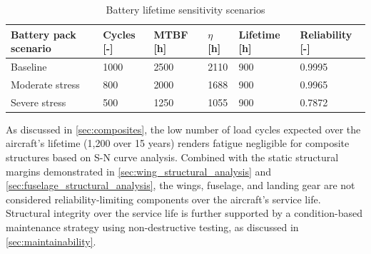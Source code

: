 \begin{table}[H]
    \centering
    \caption{Battery lifetime sensitivity scenarios}
    \label{tab:battery_lifetime_scenarios}
    \begin{tabular}{|p{2.6cm}|p{1.7cm}|p{1.7cm}|p{1.0cm}|p{2.0cm}|p{2.4cm}|}
        \hline
        \textbf{Battery pack scenario} &
        \textbf{Cycles [-]} &
        \textbf{MTBF [h]} &
        \textbf{$\eta$ [h]} &
        \textbf{Lifetime [h]} &
        \textbf{Reliability [-]} \\
        \hline\hline
        Baseline
        & 1000
        & 2500
        & 2110
        & 900
        & 0.9995 \\
        \hline
        Moderate stress
        & 800
        & 2000
        & 1688
        & 900
        & 0.9965 \\
        \hline
        Severe stress
        & 500
        & 1250
        & 1055
        & 900
        & 0.7872 \\
        \hline
    \end{tabular}
\end{table}

As discussed in \autoref{sec:composites}, the low number of load cycles expected over the aircraft's lifetime (1,200 over 15 years) renders fatigue negligible for composite structures based on S-N curve analysis. Combined with the static structural margins demonstrated in \autoref{sec:wing_structural_analysis} and \autoref{sec:fuselage_structural_analysis}, the wings, fuselage, and landing gear are not considered reliability-limiting components over the aircraft's service life. Structural integrity over the service life is further supported by a condition-based maintenance strategy using non-destructive testing, as discussed in \autoref{sec:maintainability}.


